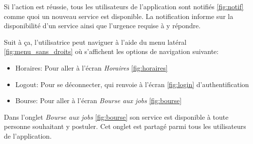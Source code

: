 Si l'action est réussie, tous les utilisateurs de l'application sont notifiés \ref{fig:notif} comme quoi un 
nouveau service est disponible. La notification informe sur la disponibilité d'un service ainsi que 
l'urgence requise à y répondre.

Suit à ça, l'utilisatrice peut naviguer à l'aide du menu latéral \ref{fig:menu_sans_droits} où s'affichent les options
de navigation suivante:
\smallskip
\begin{itemize}
    \item Horaires: Pour aller à l'écran \textit{Horaires} \ref{fig:horaires}
    \item Logout: Pour se déconnecter, qui renvoie à l'écran \ref{fig:login} d'authentification
    \item Bourse: Pour aller à l'écran \textit{Bourse aux jobs} \ref{fig:bourse}
\end{itemize}

\newpage
Dans l'onglet \textit{Bourse aux jobs} \ref{fig:bourse} son service est disponible à toute personne souhaitant y postuler. 
Cet onglet est partagé parmi tous les utilisateurs de l'application.

